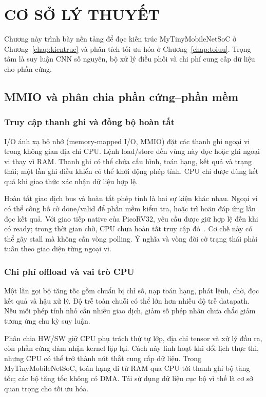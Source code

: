 \chapter{CƠ SỞ LÝ THUYẾT}
\label{chap:cosolythuyet}
Chương này trình bày nền tảng để đọc kiến trúc MyTinyMobileNetSoC ở Chương~\ref{chap:kientruc} và phân tích tối ưu hóa ở Chương~\ref{chap:toiuu}. Trọng tâm là suy luận CNN số nguyên, bộ xử lý điều phối và chi phí cung cấp dữ liệu cho phần cứng.



\section{MMIO và phân chia phần cứng--phần mềm}
\subsection{Truy cập thanh ghi và đồng bộ hoàn tất}
I/O ánh xạ bộ nhớ (memory-mapped I/O, MMIO) đặt các thanh ghi ngoại vi trong không gian địa chỉ CPU. Lệnh load/store đến vùng này đọc hoặc ghi ngoại vi thay vì RAM. Thanh ghi có thể chứa cấu hình, toán hạng, kết quả và trạng thái; một lần ghi điều khiển có thể khởi động phép tính. CPU chỉ được dùng kết quả khi giao thức xác nhận dữ liệu hợp lệ.

Hoàn tất giao dịch bus và hoàn tất phép tính là hai sự kiện khác nhau. Ngoại vi có thể công bố cờ done/valid để phần mềm kiểm tra, hoặc trì hoãn đáp ứng lần đọc kết quả. Với giao tiếp native của PicoRV32, yêu cầu được giữ hợp lệ đến khi có ready; trong thời gian chờ, CPU chưa hoàn tất truy cập đó~\cite{YosysHQ2024}. Cơ chế này có thể gây stall mà không cần vòng polling. Ý nghĩa và vòng đời cờ trạng thái phải tuân theo giao diện từng ngoại vi.

\subsection{Chi phí offload và vai trò CPU}
Một lần gọi bộ tăng tốc gồm chuẩn bị chỉ số, nạp toán hạng, phát lệnh, chờ, đọc kết quả và hậu xử lý. Độ trễ toàn chuỗi có thể lớn hơn nhiều độ trễ datapath. Nếu mỗi phép tính nhỏ cần nhiều giao dịch, giảm số phép nhân chưa chắc giảm tương ứng chu kỳ suy luận.

Phân chia HW/SW giữ CPU phụ trách thứ tự lớp, địa chỉ tensor và xử lý đầu ra, còn phần cứng đảm nhận kernel lặp lại. Cách này linh hoạt khi đổi lịch thực thi, nhưng CPU có thể trở thành nút thắt cung cấp dữ liệu. Trong MyTinyMobileNetSoC, toán hạng đi từ RAM qua CPU tới thanh ghi bộ tăng tốc; các bộ tăng tốc không có DMA. Tái sử dụng dữ liệu cục bộ vì thế là cơ sở quan trọng cho tối ưu hóa.

